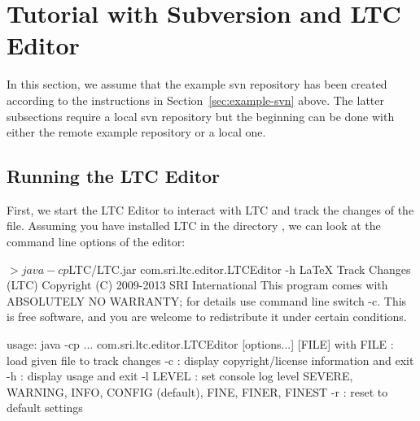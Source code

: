 \ifxetex%
\section{Tutorial with Subversion and LTC Editor} \label{sec:tutorial-svn}

In this section, we assume that the example svn repository has been created according to the instructions in Section~\ref{sec:example-svn} above.  The latter subsections require a local svn repository but the beginning can be done with either the remote example repository or a local one.  

\subsection{Running the LTC Editor}

First, we start the LTC Editor to interact with LTC and track the changes of the file.  Assuming you have installed LTC in the directory , we can look at the command line options of the editor:
\begin{CodeVerbatim}[commandchars=\\\{\}]
$> java -cp $LTC/LTC.jar com.sri.ltc.editor.LTCEditor -h
LaTeX Track Changes (LTC)  Copyright (C) 2009-2013  SRI International
This program comes with ABSOLUTELY NO WARRANTY; for details use command line switch -c.
This is free software, and you are welcome to redistribute it under certain conditions.

usage: java -cp ... com.sri.ltc.editor.LTCEditor [options...] [FILE] 
with
 FILE     : load given file to track changes
 -c       : display copyright/license information and exit
 -h       : display usage and exit
 -l LEVEL : set console log level
            SEVERE, WARNING, INFO, CONFIG (default), FINE, FINER, FINEST
 -r       : reset to default settings
\end{CodeVerbatim}

